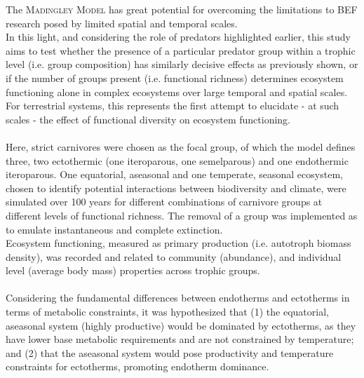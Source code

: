 The \textsc{Madingley Model} has great potential for overcoming the limitations to BEF research posed by limited spatial and temporal scales. \\
In this light, and considering the role of predators highlighted earlier, this study aims to test whether the presence of a particular predator group within a trophic level (i.e. group composition) has similarly decisive effects as previously shown, or if the number of groups present (i.e. functional richness) determines ecosystem functioning alone in complex ecosystems over large temporal and spatial scales. \\ 
For terrestrial systems, this represents the first attempt to elucidate - at such scales - the effect of functional diversity on ecosystem functioning.
\\\\
Here, strict carnivores were chosen as the focal group, of which the model defines three, two ectothermic (one iteroparous, one semelparous) and one endothermic iteroparous. 
One equatorial, aseasonal and one temperate, seasonal ecosystem, chosen to identify potential interactions between biodiversity and climate, were simulated over 100 years for different combinations of carnivore groups at different levels of functional richness. The removal of a group was implemented as to emulate instantaneous and complete extinction.\\
Ecosystem functioning, measured as primary production (i.e. autotroph biomass density), was recorded and related to community (abundance), and individual level (average body mass) properties across trophic groups.\\\\
Considering the fundamental differences between endotherms and ectotherms in terms of metabolic constraints, it was hypothesized that (1) the equatorial, aseasonal system (highly productive) would be dominated by ectotherms, as they have lower base metabolic requirements and are not constrained by temperature; and (2) that the aseasonal system would pose productivity   and temperature constraints for ectotherms, promoting endotherm dominance.
%
%
%
%

